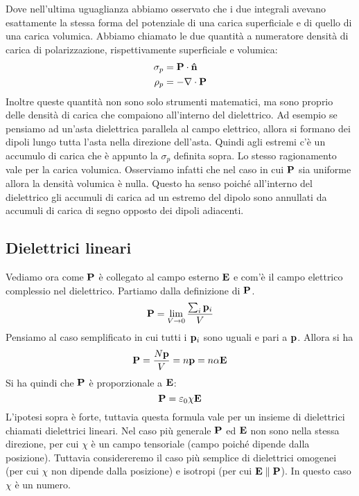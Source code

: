 Dove nell'ultima uguaglianza abbiamo osservato che i due integrali avevano esattamente la stessa forma del potenziale di una carica superficiale e di quello di una carica volumica. Abbiamo chiamato le due quantità a numeratore densità di carica di polarizzazione, rispettivamente superficiale e volumica:
\begin{align}
    \sigma_p    &= \mathbf P \cdot \mathbf{\hat n } \\
    \rho_p      &= - \nabla \cdot \mathbf P
\end{align}
Inoltre queste quantità non sono solo strumenti matematici, ma sono proprio delle densità di carica che compaiono all'interno del dielettrico. Ad esempio se pensiamo ad un'asta dielettrica parallela al campo elettrico, allora si formano dei dipoli lungo tutta l'asta nella direzione dell'asta. Quindi agli estremi c'è un accumulo di carica che è appunto la $\sigma_p$ definita sopra. Lo stesso ragionamento vale per la carica volumica. Osserviamo infatti che nel caso in cui $\mathbf P$ sia uniforme allora la densità volumica è nulla. Questo ha senso poiché all'interno del dielettrico gli accumuli di carica ad un estremo del dipolo sono annullati da accumuli di carica di segno opposto dei dipoli adiacenti.


\subsection{Dielettrici lineari} %
\label{sub:dielettrici_lineari}

Vediamo ora come $\mathbf P$ è collegato al campo esterno $\mathbf E$ e com'è il campo elettrico complessio nel dielettrico. 
Partiamo dalla definizione di $\mathbf P$. 
\begin{equation}
    \mathbf P = \lim_{V \to 0} \frac{ \sum_i \mathbf p_i }{ V } 
\end{equation}
Pensiamo al caso semplificato in cui tutti i $\mathbf p_i$ sono uguali e pari a $\mathbf p$. Allora si ha 
\begin{equation}
    \mathbf P = \frac{ N \mathbf p }{ V } = n \mathbf p = n \alpha \mathbf E
\end{equation}
Si ha quindi che $\mathbf P$ è proporzionale a $\mathbf E$:
\begin{equation}
    \mathbf P = \varepsilon_0 \chi \mathbf E
\end{equation}
L'ipotesi sopra è forte, tuttavia questa formula vale per un insieme di dielettrici chiamati dielettrici lineari. Nel caso più generale $\mathbf P$ ed $\mathbf E$ non sono nella stessa direzione, per cui $\chi$ è un campo tensoriale (campo poiché dipende dalla posizione). Tuttavia considereremo il caso più semplice di dielettrici omogenei (per cui $\chi$ non dipende dalla posizione) e isotropi (per cui $\mathbf E \parallel \mathbf P$). In questo caso $\chi$ è un numero. 

